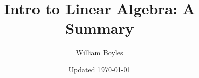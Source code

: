 


	\title{Intro to Linear Algebra: A Summary}
	\author{William Boyles}
	\date{Updated \today}
	
	\frontmatter
		\maketitle
		\tableofcontents
		
	\mainmatter
		
	
	\appendix
	
	\backmatter
